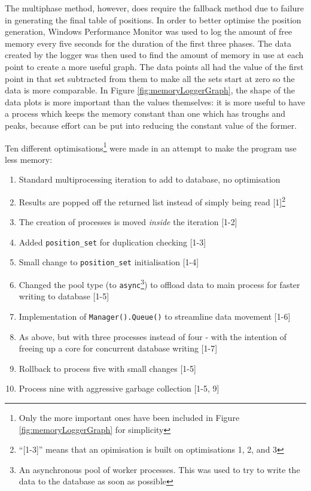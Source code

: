 \documentclass{report}
\newcommand{\tit}[1]{\textit{#1}}
\begin{document}
    The multiphase method, however, does require the fallback method due to failure in generating the final table of positions. In order to better optimise the position generation, Windows Performance Monitor was used to log the amount of free memory every five seconds for the duration of the first three phases. The data created by the logger was then used to find the amount of memory in use at each point to create a more useful graph. The data points all had the value of the first point in that set subtracted from them to make all the sets start at zero so the data is more comparable. In Figure \ref{fig:memoryLoggerGraph}, the shape of the data plots is more important than the values themselves: it is more useful to have a process which keeps the memory constant than one which has troughs and peaks, because effort can be put into reducing the constant value of the former.
    
    Ten different optimisations\footnote{Only the more important ones have been included in Figure \ref{fig:memoryLoggerGraph} for simplicity} were made in an attempt to make the program use less memory:
    
    \begin{enumerate}
    	\item Standard multiprocessing iteration to add to database, no optimisation
    	\item Results are popped off the returned list instead of simply being read [1]\footnote{\enquote{[1-3]} means that an opimisation is built on optimisations 1, 2, and 3}
    	\item The creation of processes is moved \tit{inside} the iteration [1-2]
    	\item Added \lstinline|position_set| for duplication checking [1-3]
    	\item Small change to \lstinline|position_set| initialisation [1-4]
    	\item Changed the pool type (to \lstinline|async|\footnote{An asynchronous pool of worker processes. This was used to try to write the data to the database as soon as possible}) to offload data to main process for faster writing to database [1-5]
    	\item Implementation of \lstinline|Manager().Queue()| to streamline data movement [1-6]
    	\item As above, but with three processes instead of four - with the intention of freeing up a core for concurrent database writing [1-7]
    	\item Rollback to process five with small changes [1-5]
    	\item Process nine with aggressive garbage collection [1-5, 9]
    \end{enumerate}
    
\end{document}

